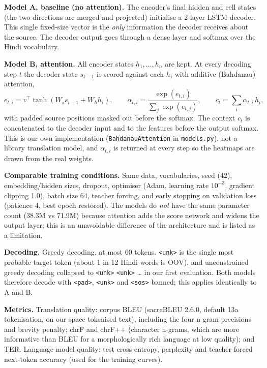 \documentclass[10pt,a4paper]{article}
\newcommand{\code}[1]{\texttt{#1}}
\newcommand{\unk}{\texttt{<unk>}}
\begin{document}
\textbf{Model A, baseline (no attention).} The encoder's final hidden and cell states (the two directions are merged and projected)
initialise a 2-layer LSTM decoder. This single fixed-size vector is the \emph{only} information the decoder receives about the source.
The decoder output goes through a dense layer and softmax over the Hindi vocabulary.

\textbf{Model B, attention.} All encoder states $h_1,\dots,h_n$ are kept. At every decoding step $t$ the decoder state $s_{t-1}$ is scored
against each $h_i$ with additive (Bahdanau) attention,
\[
e_{t,i} = v^{\top}\tanh(W_s s_{t-1} + W_h h_i),\qquad
\alpha_{t,i} = \frac{\exp(e_{t,i})}{\sum_j \exp(e_{t,j})},\qquad
c_t = \sum_i \alpha_{t,i}\, h_i ,
\]
with padded source positions masked out before the softmax. The context $c_t$ is concatenated to the decoder input and to the features
before the output softmax. This is our own implementation (\code{BahdanauAttention} in \code{models.py}), not a library translation
model, and $\alpha_{t,i}$ is returned at every step so the heatmaps are drawn from the real weights.

\textbf{Comparable training conditions.} Same data, vocabularies, seed (42), embedding/hidden sizes, dropout, optimiser (Adam, learning
rate $10^{-3}$, gradient clipping 1.0), batch size 64, teacher forcing, and early stopping on validation loss (patience 4, best epoch
restored). The models do \emph{not} have the same parameter count (38.3M vs 71.9M) because attention adds the score network and widens the
output layer; this is an unavoidable difference of the architecture and is listed as a limitation.

\textbf{Decoding.} Greedy decoding, at most 60 tokens. \unk{} is the single most probable target token (about 1 in 12 Hindi words is OOV), and
unconstrained greedy decoding collapsed to \unk{} \unk{} \dots{} in our first evaluation. Both models therefore decode with \code{<pad>},
\code{<unk>} and \code{<sos>} banned; this applies identically to A and B.

\textbf{Metrics.} Translation quality: corpus BLEU (sacreBLEU 2.6.0, default 13a tokenisation, on our space-tokenised text), including the four
n-gram precisions and brevity penalty; chrF and chrF++ (character n-grams, which are more informative than BLEU for a morphologically rich
language at low quality); and TER. Language-model quality: test cross-entropy, perplexity and teacher-forced next-token accuracy
(used for the training curves).

\end{document}
